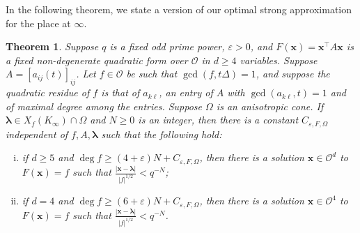 \documentclass[10pt]{amsart}
\theoremstyle{plain}
\theoremstyle{plain}
\newtheorem{theorem}{Theorem}[section]
\renewcommand{\vec}[1]{\mathbf{#1}}
\theoremstyle{remark}
\theoremstyle{definition}
\newcommand{\Ki}{K_\infty}
\begin{document}
In the following theorem, we state a version of our optimal strong approximation for the place at $\infty$. 
\begin{theorem}\label{infmainthm}
Suppose $q$ is a fixed odd prime power, $\varepsilon>0$, and  $F(\vec{x})=\vec{x}^{\intercal}A\vec{x}$ is a fixed non-degenerate quadratic form over $\mathcal{O}$ in $d\geq 4$ variables. Suppose $A=[a_{ij}(t)]_{ij}$. Let $f\in\mathcal{O}$ be such that $\gcd(f,t\Delta)=1$, and suppose the quadratic residue of $f$ is that of $a_{k\ell}$, an entry of $A$ with $\gcd(a_{k\ell},t)=1$ and of maximal degree among the entries. Suppose $\Omega$ is an anisotropic cone. If $\boldsymbol{\lambda}\in X_f(\Ki)\cap\Omega$ and $N\geq 0$ is an integer, then there is a constant $C_{\varepsilon,F,\Omega}$ independent of $f,A, \boldsymbol{\lambda}$ such that the following hold:
\begin{enumerate}[(i)]
\item \label{mainthmpart1}if $d\geq 5$ and $\deg f \geq (4+\varepsilon)N +C_{\varepsilon,F,\Omega}$, then  there is a solution $\vec{x} \in \mathcal{O}^d $ to $F(\vec{x})=f$ such that $\frac{|\vec{x}-\boldsymbol{\lambda}|}{|f|^{1/2}}< q^{-N}$;
\\
\item if $d=4$ and $\deg f \geq (6+\varepsilon)N+C_{\varepsilon,F,\Omega}$, then  there is a solution $\vec{x} \in \mathcal{O}^4 $ to $F(\vec{x})=f$ such that $\frac{|\vec{x}-\boldsymbol{\lambda}|}{|f|^{1/2}}< q^{-N}$.
\end{enumerate}
\end{theorem}
\end{document}
